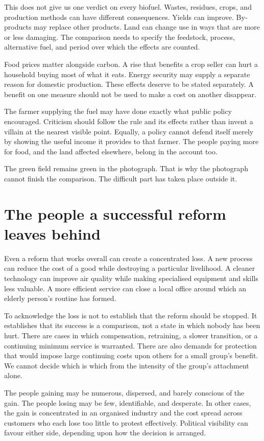 \documentclass[12pt,a4paper]{book}
\begin{document}
This does not give us one verdict on every biofuel. Wastes, residues, crops, and production methods can have different consequences. Yields can improve. By-products may replace other products. Land can change use in ways that are more or less damaging. The comparison needs to specify the feedstock, process, alternative fuel, and period over which the effects are counted.

Food prices matter alongside carbon. A rise that benefits a crop seller can hurt a household buying most of what it eats. Energy security may supply a separate reason for domestic production. These effects deserve to be stated separately. A benefit on one measure should not be used to make a cost on another disappear.

The farmer supplying the fuel may have done exactly what public policy encouraged. Criticism should follow the rule and its effects rather than invent a villain at the nearest visible point. Equally, a policy cannot defend itself merely by showing the useful income it provides to that farmer. The people paying more for food, and the land affected elsewhere, belong in the account too.

The green field remains green in the photograph. That is why the photograph cannot finish the comparison. The difficult part has taken place outside it.

\section*{The people a successful reform leaves behind}

Even a reform that works overall can create a concentrated loss. A new process can reduce the cost of a good while destroying a particular livelihood. A cleaner technology can improve air quality while making specialised equipment and skills less valuable. A more efficient service can close a local office around which an elderly person's routine has formed.

To acknowledge the loss is not to establish that the reform should be stopped. It establishes that its success is a comparison, not a state in which nobody has been hurt. There are cases in which compensation, retraining, a slower transition, or a continuing minimum service is warranted. There are also demands for protection that would impose large continuing costs upon others for a small group's benefit. We cannot decide which is which from the intensity of the group's attachment alone.

The people gaining may be numerous, dispersed, and barely conscious of the gain. The people losing may be few, identifiable, and desperate. In other cases, the gain is concentrated in an organised industry and the cost spread across customers who each lose too little to protest effectively. Political visibility can favour either side, depending upon how the decision is arranged.
\end{document}
